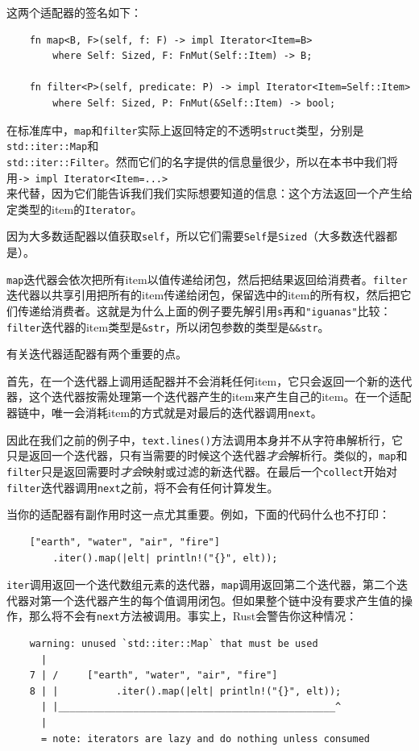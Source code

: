 这两个适配器的签名如下：
\begin{verbatim}
    fn map<B, F>(self, f: F) -> impl Iterator<Item=B>
        where Self: Sized, F: FnMut(Self::Item) -> B;

    fn filter<P>(self, predicate: P) -> impl Iterator<Item=Self::Item>
        where Self: Sized, P: FnMut(&Self::Item) -> bool;
\end{verbatim}

在标准库中，\texttt{map}和\texttt{filter}实际上返回特定的不透明\texttt{struct}类型，分别是\texttt{std::iter::Map}和\\
\texttt{std::iter::Filter}。然而它们的名字提供的信息量很少，所以在本书中我们将用\texttt{-> impl Iterator<Item=...>}\\
来代替，因为它们能告诉我们我们实际想要知道的信息：这个方法返回一个产生给定类型的item的\texttt{Iterator}。

因为大多数适配器以值获取\texttt{self}，所以它们需要\texttt{Self}是\texttt{Sized}（大多数迭代器都是）。

\texttt{map}迭代器会依次把所有item以值传递给闭包，然后把结果返回给消费者。\texttt{filter}迭代器以共享引用把所有的item传递给闭包，保留选中的item的所有权，然后把它们传递给消费者。这就是为什么上面的例子要先解引用\texttt{s}再和\texttt{"iguanas"}比较：\texttt{filter}迭代器的item类型是\texttt{\&str}，所以闭包参数的类型是\texttt{\&\&str}。

有关迭代器适配器有两个重要的点。

首先，在一个迭代器上调用适配器并不会消耗任何item，它只会返回一个新的迭代器，这个迭代器按需处理第一个迭代器产生的item来产生自己的item。在一个适配器链中，唯一会消耗item的方式就是对最后的迭代器调用\texttt{next}。

因此在我们之前的例子中，\texttt{text.lines()}方法调用本身并不从字符串解析行，它只是返回一个迭代器，只有当需要的时候这个迭代器\emph{才会}解析行。类似的，\texttt{map}和\texttt{filter}只是返回需要时\emph{才会}映射或过滤的新迭代器。在最后一个\texttt{collect}开始对\texttt{filter}迭代器调用\texttt{next}之前，将不会有任何计算发生。

当你的适配器有副作用时这一点尤其重要。例如，下面的代码什么也不打印：
\begin{verbatim}
    ["earth", "water", "air", "fire"]
        .iter().map(|elt| println!("{}", elt));
\end{verbatim}

\texttt{iter}调用返回一个迭代数组元素的迭代器，\texttt{map}调用返回第二个迭代器，第二个迭代器对第一个迭代器产生的每个值调用闭包。但如果整个链中没有要求产生值的操作，那么将不会有\texttt{next}方法被调用。事实上，Rust会警告你这种情况：
\begin{verbatim}
    warning: unused `std::iter::Map` that must be used
      |
    7 | /     ["earth", "water", "air", "fire"]
    8 | |          .iter().map(|elt| println!("{}", elt));
      | |________________________________________________^
      |
      = note: iterators are lazy and do nothing unless consumed
\end{verbatim}


